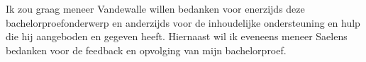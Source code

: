 
\chapter*{}
\label{ch:voorwoord}

Ik zou graag meneer Vandewalle willen bedanken voor enerzijds deze bachelorproefonderwerp en 
anderzijds voor de inhoudelijke ondersteuning en hulp die hij aangeboden en gegeven heeft.
Hiernaast wil ik eveneens meneer Saelens bedanken voor de feedback en opvolging van mijn bachelorproef.

